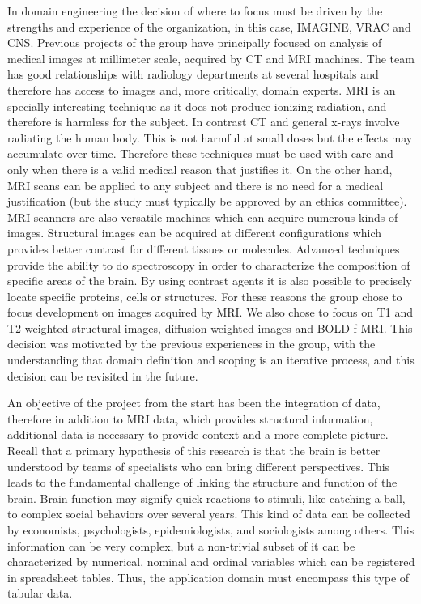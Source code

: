 In domain engineering the decision of where to focus must be driven by the strengths and experience of the organization, in this case, IMAGINE, VRAC and CNS. Previous projects of the group have principally focused on analysis of medical images at millimeter scale, acquired by CT and MRI machines. The team has good relationships with radiology departments at several hospitals and therefore has access to images and, more critically, domain experts. MRI is an specially interesting technique as it does not produce ionizing radiation, and therefore is harmless for the subject. In contrast CT and general x-rays involve radiating the human body. This is not harmful at small doses but the effects may accumulate over time. Therefore these techniques must be used with care and only when there is a valid medical reason that justifies it. On the other hand, MRI scans can be applied to any subject and there is no need for a medical justification (but the study must typically be approved by an ethics committee). MRI scanners are also versatile machines which can acquire numerous kinds of images. Structural images can be acquired at different configurations which provides better contrast for different tissues or molecules. Advanced techniques provide the ability to do spectroscopy in order to characterize the composition of specific areas of the brain. By using contrast agents it is also possible to precisely locate specific proteins, cells or structures. 
For these reasons the group chose to focus development on images acquired by MRI. We also chose to focus on T1 and T2 weighted structural images, diffusion weighted images and BOLD f-MRI. This decision was motivated by the previous experiences in the group, with the understanding that domain definition and scoping is an iterative process, and this decision can be revisited in the future.

An objective of the project from the start has been the integration of data, therefore in addition to MRI data, which provides structural information, additional data is necessary to provide context and a more complete picture. Recall that a primary  hypothesis of this research is that the brain is better understood by teams of specialists who can bring different perspectives. This leads to the fundamental  challenge of linking the structure and function of the brain. Brain function may signify quick reactions to stimuli, like catching a ball, to complex social behaviors over several years. This kind of data can be collected by economists, psychologists, epidemiologists, and sociologists among others. This information can be very complex, but a non-trivial subset of it can be characterized by numerical, nominal and ordinal variables which can be registered in spreadsheet tables. Thus, the application domain must encompass this type of tabular data. 

